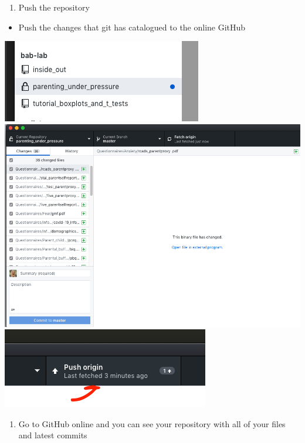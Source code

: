 \documentclass[]{book}
\providecommand{\tightlist}{%
  \setlength{\itemsep}{0pt}\setlength{\parskip}{0pt}}
\begin{document}
\begin{enumerate}
\def\labelenumi{\arabic{enumi}.}
\setcounter{enumi}{7}
\tightlist
\item
  Push the repository
\end{enumerate}

\begin{itemize}
\tightlist
\item
  Push the changes that git has catalogued to the online GitHub
\end{itemize}

\includegraphics{images/research_protocols/github/9.png}
\includegraphics{images/research_protocols/github/10.png}
\includegraphics{images/research_protocols/github/12.png}

\begin{enumerate}
\def\labelenumi{\arabic{enumi}.}
\setcounter{enumi}{8}
\tightlist
\item
  Go to GitHub online and you can see your repository with all of your
  files and latest commits
\end{enumerate}
\end{document}
